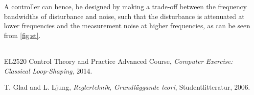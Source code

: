 \documentclass[a4paper]{article}
\begin{document}
A controller can hence, be designed by making a trade-off between the frequency bandwidths of disturbance and noise, such that the disturbance is attenuated at lower frequencies and the measurement noise at higher frequencies, as can be seen from \cref{fig:st}.
\\ \\
\newpage

\begin{thebibliography}{9}

EL2520 Control Theory and Practice Advanced Course, \emph{Computer Exercise: Classical Loop-Shaping}, 2014.

T. Glad and L. Ljung, \emph{Reglerteknik, Grundläggande teori}, Studentlitteratur, 2006.

\end{thebibliography}




%
%


\end{document}
